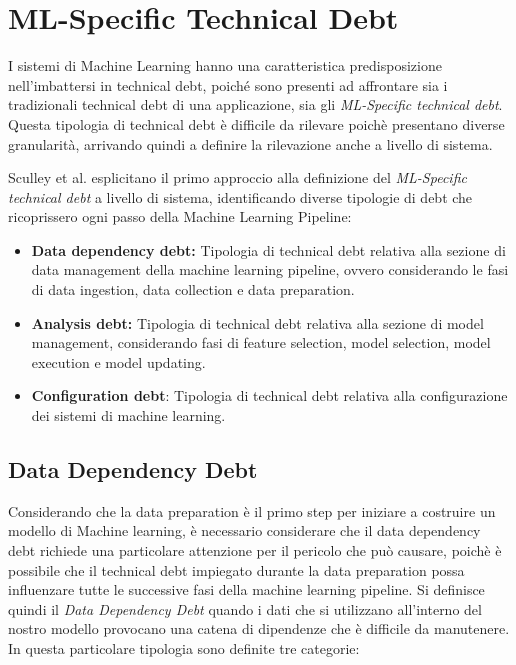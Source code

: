 

\section{ML-Specific Technical Debt}
I sistemi di Machine Learning hanno una caratteristica predisposizione nell'imbattersi in technical debt, poiché sono presenti ad affrontare sia i tradizionali technical debt di una applicazione, sia gli \textit{ML-Specific technical debt}.
Questa tipologia di technical debt è difficile da rilevare poichè presentano diverse granularità, arrivando quindi a definire la rilevazione anche a livello di sistema.

Sculley et al. \cite{sculley2015hidden} esplicitano il primo approccio alla definizione del \textit{ML-Specific technical debt} a livello di sistema, identificando diverse tipologie di debt che ricoprissero ogni passo della Machine Learning Pipeline:

\begin{itemize}
    \item \textbf{Data dependency debt:} Tipologia di technical debt relativa alla sezione di data management della machine learning pipeline, ovvero considerando le fasi di data ingestion, data collection e data preparation.
    \item \textbf{Analysis debt:} Tipologia di technical debt relativa alla sezione di model management, considerando fasi di feature selection, model selection, model execution e model updating.
    \item \textbf{Configuration debt}: Tipologia di technical debt relativa alla configurazione dei sistemi di machine learning.
\end{itemize}

\subsection{Data Dependency Debt}
Considerando che la data preparation è il primo step per iniziare a costruire un modello di Machine learning, è necessario considerare che il data dependency debt richiede una particolare attenzione per il pericolo che può causare, poichè è possibile che il technical debt impiegato durante la data preparation possa influenzare tutte le successive fasi della machine learning pipeline.
Si definisce quindi il \textit{Data Dependency Debt} quando i dati che si utilizzano all'interno del nostro modello provocano una catena di dipendenze che è difficile da manutenere.
In questa particolare tipologia sono definite tre categorie:
